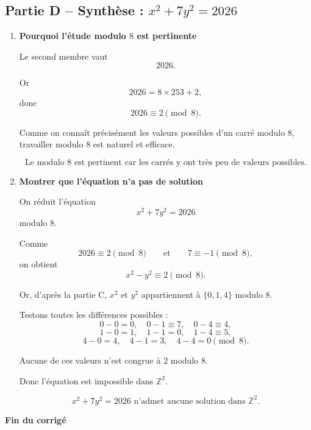 \documentclass[11pt,a4paper]{article}
\newcommand{\Z}{\mathbb{Z}}
\begin{document}
\subsection*{Partie D -- Synthèse : \(x^2+7y^2=2026\)}

\begin{enumerate}[label=\textbf{4.\arabic*}, resume, leftmargin=1.6em]

\item \textbf{Pourquoi l’étude modulo \(8\) est pertinente}

Le second membre vaut
\[
2026.
\]

Or
\[
2026=8\times 253+2,
\]
donc
\[
2026\equiv 2\pmod 8.
\]

Comme on connaît précisément les valeurs possibles d’un carré modulo \(8\), travailler modulo \(8\) est naturel et efficace.

\[
\boxed{\text{Le modulo }8\text{ est pertinent car les carrés y ont très peu de valeurs possibles.}}
\]

\item \textbf{Montrer que l’équation n’a pas de solution}

On réduit l’équation
\[
x^2+7y^2=2026
\]
modulo \(8\).

Comme
\[
2026\equiv 2\pmod 8
\qquad\text{et}\qquad
7\equiv -1\pmod 8,
\]
on obtient
\[
x^2-y^2\equiv 2\pmod 8.
\]

Or, d’après la partie C, \(x^2\) et \(y^2\) appartiennent à \(\{0,1,4\}\) modulo \(8\).

Testons toutes les différences possibles :
\[
0-0=0,\quad 0-1\equiv 7,\quad 0-4\equiv 4,
\]
\[
1-0=1,\quad 1-1=0,\quad 1-4\equiv 5,
\]
\[
4-0=4,\quad 4-1=3,\quad 4-4=0 \pmod 8.
\]

Aucune de ces valeurs n’est congrue à \(2\) modulo \(8\).

Donc l’équation est impossible dans \(\Z^2\).

\[
\boxed{x^2+7y^2=2026 \text{ n’admet aucune solution dans } \Z^2.}
\]

\end{enumerate}

\vspace{0.8em}
\begin{center}
\textbf{Fin du corrigé}
\end{center}
\end{document}
